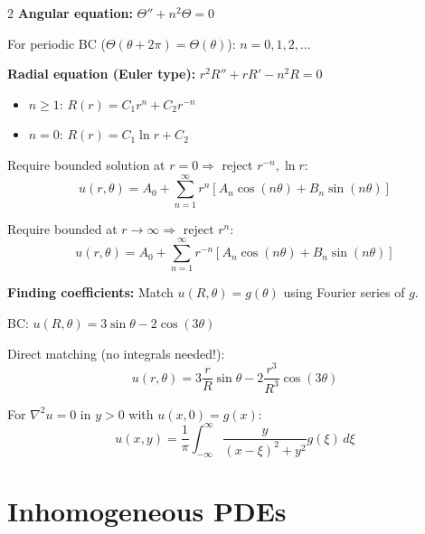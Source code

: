 \documentclass[10pt,a4paper]{article}
\begin{document}
\begin{multicols}{2}
\textbf{Angular equation:} $\Theta'' + n^2\Theta = 0$

For periodic BC ($\Theta(\theta+2\pi) = \Theta(\theta)$): $n = 0,1,2,\ldots$

\textbf{Radial equation (Euler type):} $r^2 R'' + rR' - n^2 R = 0$
\begin{itemize}
    \item $n \geq 1$: $R(r) = C_1 r^n + C_2 r^{-n}$
    \item $n = 0$: $R(r) = C_1\ln r + C_2$
\end{itemize}

\begin{keyformula}
Require bounded solution at $r=0 \Rightarrow$ reject $r^{-n}, \ln r$:
\begin{equation}
u(r,\theta) = A_0 + \sum_{n=1}^{\infty} r^n[A_n\cos(n\theta) + B_n\sin(n\theta)]
\end{equation}
\end{keyformula}

\begin{keyformula}
Require bounded at $r\to\infty \Rightarrow$ reject $r^n$:
\begin{equation}
u(r,\theta) = A_0 + \sum_{n=1}^{\infty} r^{-n}[A_n\cos(n\theta) + B_n\sin(n\theta)]
\end{equation}
\end{keyformula}

\textbf{Finding coefficients:} Match $u(R,\theta) = g(\theta)$ using Fourier series of $g$.

\begin{example}
BC: $u(R,\theta) = 3\sin\theta - 2\cos(3\theta)$

Direct matching (no integrals needed!):
\begin{equation}
u(r,\theta) = 3\frac{r}{R}\sin\theta - 2\frac{r^3}{R^3}\cos(3\theta)
\end{equation}
\end{example}

\begin{keyformula}
For $\nabla^2 u = 0$ in $y > 0$ with $u(x,0) = g(x)$:
\begin{equation}
u(x,y) = \frac{1}{\pi}\int_{-\infty}^{\infty}\frac{y}{(x-\xi)^2 + y^2}g(\xi)\,d\xi
\end{equation}
\end{keyformula}

\section{Inhomogeneous PDEs}


\end{multicols}
\end{document}
